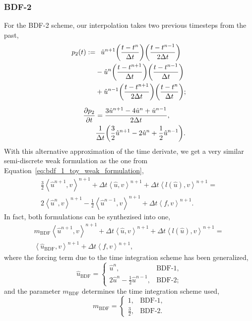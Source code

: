\documentclass[../../thesis.tex]{subfiles}
\newcommand{\inner}[2]{\left<#1, #2\right>}
\newcommand{\dt}{\ensuremath{\Delta t}}
\begin{document}
\subsubsection{BDF-2}
For the BDF-2 scheme,
our interpolation takes two previous timesteps from the past,
\begin{subequations}
\begin{align}
    p_2(t) 
    := 
    &\phantom{+}\hat{u}^{n+1}
    \qty(\frac{t-t^{n}}{\dt})
    \qty(\frac{t-t^{n-1}}{2\dt})
    \nonumber \\
    &-
    \hat{u}^{n}
    \qty(\frac{t-t^{n+1}}{\dt})
    \qty(\frac{t-t^{n-1}}{\dt}) 
    \nonumber \\
    &+
    \hat{u}^{n-1}
    \qty(\frac{t-t^{n+1}}{2\dt})
    \qty(\frac{t-t^{n}}{\dt});
    \\[2mm]
    \pdv{p_2}{t} 
    &= 
    \frac{3\hat{u}^{n+1} - 4\hat{u}^{n} + \hat{u}^{n-1}}{2\dt},
    \nonumber \\
    &\frac{1}{\dt}
    \qty(
        \frac{3}{2}\hat{u}^{n+1} 
        - 2\hat{u}^{n} 
        + \frac{1}{2}\hat{u}^{n-1}
        ).
    \end{align}
\end{subequations}
With this alternative approximation of the time derivate, 
we get a very similar semi-discrete weak formulation as the one 
from Equation~\eqref{eq:bdf_1_toy_weak_formulation},
\begin{align}
    \frac{3}{2}\inner{\hat{u}^{n+1}}{v}^{n+1}
    + \dt \inner{\hat{u}}{v}^{n+1}
    + \dt \inner{l(\hat{u})}{v}^{n+1}
    =
    \nonumber \\
    2            \inner{\hat{u}^{n}  }{v}^{n+1}
    - \frac{1}{2}\inner{\hat{u}^{n-1}}{v}^{n+1}
    + 
    \dt \inner{f}{v}^{n+1}.
    \label{eq:bdf_2_toy_weak_formulation}
\end{align}
In fact, both formulations can be synthezised into one,
\begin{align}
    m_{\text{BDF}}\inner{\hat{u}^{n+1}}{v}^{n+1}
    + \dt \inner{\hat{u}}{v}^{n+1}
    + \dt \inner{l(\hat{u})}{v}^{n+1}
    =
    \nonumber \\
    \inner{\hat{u}_{\text{BDF}}  }{v}^{n+1}
    + 
    \dt \inner{f}{v}^{n+1},
    \label{eq:weak_formulation_generalized_bdf}
\end{align}
where the forcing term due to the time integration scheme has been generalized,
\begin{equation}
    \hat{u}_{\text{BDF}} =
    \begin{cases}
        \hat{u}^{n}, &\text{BDF-1},
        \\    
        2\hat{u}^{n} 
        -\frac{1}{2}\hat{u}^{n-1}, &\text{BDF-2};
    \end{cases}
    \label{eq:bdf_forcing_term_generalization}
\end{equation}
and the parameter $m_{\text{BDF}}$ determines the time integration scheme used,
\begin{equation}
    m_{\text{BDF}} = 
    \begin{cases}
    1, &\text{BDF-1},
    \\    
    \frac{3}{2}, &\text{BDF-2}.
    \end{cases}
\end{equation}
\end{document}
